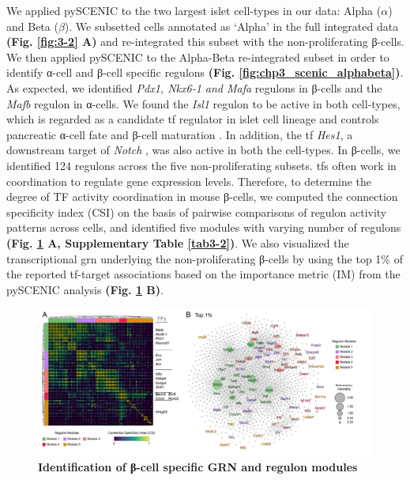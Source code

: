 \par We applied pySCENIC to the two largest islet cell-types in our data: Alpha ($\alpha$) and Beta ($\beta$). We subsetted cells annotated as `Alpha' in the full integrated data \textbf{(Fig. \ref{fig:3-2} A)} and re-integrated this subset with the non-proliferating β-cells. We then applied pySCENIC to the Alpha-Beta re-integrated subset in order to identify α-cell and β-cell specific regulons \textbf{(Fig. \ref{fig:chp3_scenic_alphabeta})}. As expected, we identified \textit{Pdx1, Nkx6-1 and Mafa} regulons in β-cells and the \textit{Mafb} regulon in α-cells. We found the \textit{Isl1} regulon to be active in both cell-types, which is regarded as a candidate \gls{tf} regulator in islet cell lineage \textbf{\cite{juhl_mouse_2008}} and controls pancreatic α-cell fate and β-cell maturation \textbf{\cite{bohuslavova_isl1_2023}}. In addition, the \gls{tf} \textit{Hes1}, a downstream target of \textit{Notch} \textbf{\cite{hashemitabar_redefining_2019}}, was also active in both the cell-types.
\clearpage 
In β-cells, we identified 124 regulons across the five non-proliferating subsets. \glspl{tf} often work in coordination to regulate gene expression levels. Therefore, to determine the degree of TF activity coordination in mouse β-cells, we computed the connection specificity index (CSI) on the basis of pairwise comparisons of regulon activity patterns across cells, and identified five modules with varying number of regulons \textbf{(Fig. \ref{fig:3-10} A, Supplementary Table \ref{tab3-2})}. We also visualized the transcriptional \gls{grn} underlying the non-proliferating β-cells by using the top 1\% of the reported \gls{tf}-target associations based on the importance metric (IM) from the pySCENIC analysis \textbf{(Fig. \ref{fig:3-10} B)}.\\

\begin{figure}[H]
\centering
\includegraphics[width=\linewidth]{Chapter5/Fig/F3-10-02.png}
\caption[Identification of β-cell specific GRN and regulon modules]{\textbf{Identification of β-cell specific GRN and regulon modules}\\}
\label{fig:3-10}
\end{figure}

